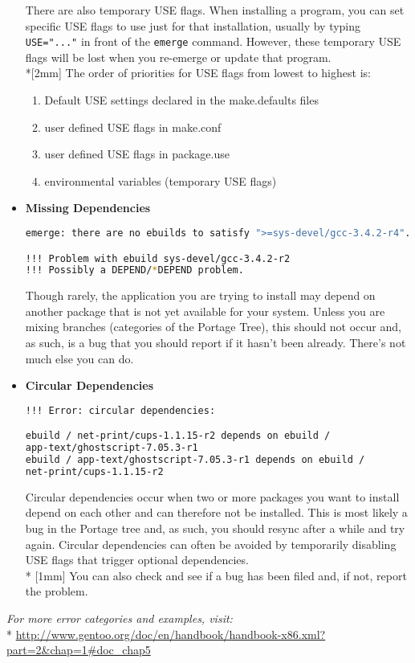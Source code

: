 \documentclass[11pt]{article}
\begin{document}
\begin{itemize}
        There are also temporary USE flags. When installing a program, you can set specific USE flags to use just for that installation, usually by typing \verb|USE="..."| in front of the \verb|emerge| command. However, these temporary USE flags will be lost when you re-emerge or update that program.
        \\*[2mm] The order of priorities for USE flags from lowest to highest is:
        \begin{enumerate}
          \item Default USE settings declared in the make.defaults files
          \item user defined USE flags in make.conf
          \item user defined USE flags in package.use
          \item environmental variables (temporary USE flags)
        \end{enumerate}
     
      \item \textbf{Missing Dependencies}
       \begin{lstlisting}[basicstyle=\ttfamily, backgroundcolor = \color{lightgray}, language = bash, xleftmargin = 0cm, framexleftmargin = 1em, framexrightmargin = 6em, showstringspaces=false]
emerge: there are no ebuilds to satisfy ">=sys-devel/gcc-3.4.2-r4".

!!! Problem with ebuild sys-devel/gcc-3.4.2-r2
!!! Possibly a DEPEND/*DEPEND problem. 
       \end{lstlisting}
       Though rarely, the application you are trying to install may depend on another package that is not yet available for your system. Unless you are mixing branches (categories of the Portage Tree), this should not occur and, as such, is a bug that you should report if it hasn't been already. There's not much else you can do.
    
      \item \textbf{Circular Dependencies}
       \begin{lstlisting}[basicstyle=\ttfamily, backgroundcolor = \color{lightgray}, language = bash, xleftmargin = 0cm, framexleftmargin = 1em, framexrightmargin = 2em, showstringspaces=false]
!!! Error: circular dependencies: 

ebuild / net-print/cups-1.1.15-r2 depends on ebuild / 
app-text/ghostscript-7.05.3-r1
ebuild / app-text/ghostscript-7.05.3-r1 depends on ebuild / 
net-print/cups-1.1.15-r2 
\end{lstlisting}
       Circular dependencies occur when two or more packages you want to install depend on each other and can therefore not be installed. This is most likely a bug in the Portage tree and, as such, you should resync after a while and try again. Circular dependencies can often be avoided by temporarily disabling USE flags that trigger optional dependencies.
       \\* [1mm] You can also check and see if a bug has been filed and, if not, report the problem.
   \end{itemize}   
   \textit{For more error categories and examples, visit:}
   \\* \url{http://www.gentoo.org/doc/en/handbook/handbook-x86.xml?part=2&chap=1#doc_chap5}
 
\end{document}
